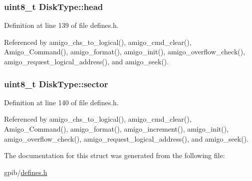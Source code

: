 \subsubsection[{\texorpdfstring{head}{head}}]{\setlength{\rightskip}{0pt plus 5cm}uint8\+\_\+t Disk\+Type\+::head}\hypertarget{structDiskType_ac4cc3cfd8e1fd4d6ec9dded35384786f}{}\label{structDiskType_ac4cc3cfd8e1fd4d6ec9dded35384786f}


Definition at line 139 of file defines.\+h.



Referenced by amigo\+\_\+chs\+\_\+to\+\_\+logical(), amigo\+\_\+cmd\+\_\+clear(), Amigo\+\_\+\+Command(), amigo\+\_\+format(), amigo\+\_\+init(), amigo\+\_\+overflow\+\_\+check(), amigo\+\_\+request\+\_\+logical\+\_\+address(), and amigo\+\_\+seek().

\subsubsection[{\texorpdfstring{sector}{sector}}]{\setlength{\rightskip}{0pt plus 5cm}uint8\+\_\+t Disk\+Type\+::sector}\hypertarget{structDiskType_a6f0a12d4184ccb30a7a5e6e6e713ca85}{}\label{structDiskType_a6f0a12d4184ccb30a7a5e6e6e713ca85}


Definition at line 140 of file defines.\+h.



Referenced by amigo\+\_\+chs\+\_\+to\+\_\+logical(), amigo\+\_\+cmd\+\_\+clear(), Amigo\+\_\+\+Command(), amigo\+\_\+format(), amigo\+\_\+increment(), amigo\+\_\+init(), amigo\+\_\+overflow\+\_\+check(), amigo\+\_\+request\+\_\+logical\+\_\+address(), and amigo\+\_\+seek().



The documentation for this struct was generated from the following file\+:\begin{DoxyCompactItemize}
\item 
gpib/\hyperlink{defines_8h}{defines.\+h}\end{DoxyCompactItemize}
